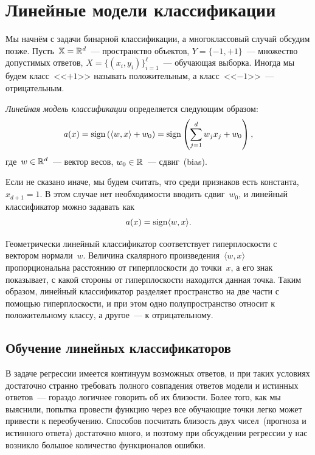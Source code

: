 \documentclass[12pt,fleqn]{article}
\begin{document}
\section{Линейные модели классификации}

Мы начнём с задачи бинарной классификации, а многоклассовый случай обсудим позже.
Пусть~$\mathbb{X} = \mathbb{R}^d$~--- пространство объектов,
$Y = \{-1, +1\}$~--- множество допустимых ответов,
$X = \{(x_i, y_i)\}_{i = 1}^\ell$~--- обучающая выборка.
Иногда мы будем класс~<<$+1$>> называть положительным, а класс~<<$-1$>>~--- отрицательным.

\emph{Линейная модель классификации} определяется следующим образом:
\[
    a(x) =
    \mathop{\rm sign}\limits \left(
        \langle w, x \rangle + w_0
    \right)
    =
    \mathop{\rm sign}\limits \left(
        \sum_{j = 1}^{d} w_j x_j + w_0
    \right),
\]
где~$w \in \mathbb{R}^d$~--- вектор весов, $w_0 \in \mathbb{R}$~--- сдвиг~(bias).

Если не сказано иначе, мы будем считать, что среди признаков
есть константа, $x_{d + 1} = 1$.
В этом случае нет необходимости вводить сдвиг~$w_0$,
и линейный классификатор можно задавать как
\[
    a(x) = \mathop{\rm sign}\limits \langle w, x \rangle.
\]

Геометрически линейный классификатор соответствует гиперплоскости с вектором нормали~$w$.
Величина скалярного произведения~$\langle w, x \rangle$ пропорциональна расстоянию
от гиперплоскости до точки~$x$, а его знак показывает, с какой стороны от гиперплоскости находится
данная точка.
Таким образом, линейный классификатор разделяет пространство на две части с помощью гиперплоскости,
и при этом одно полупространство относит к положительному классу, а другое~--- к отрицательному.

\subsection{Обучение линейных классификаторов}

В задаче регрессии имеется континуум возможных ответов, и при таких условиях
достаточно странно требовать полного совпадения ответов модели и истинных ответов~---
гораздо логичнее говорить об их близости.
Более того, как мы выяснили, попытка провести функцию через все обучающие точки
легко может привести к переобучению.
Способов посчитать близость двух чисел~(прогноза и истинного ответа) достаточно много,
и поэтому при обсуждении регрессии у нас возникло большое количество функционалов ошибки.
\end{document}
